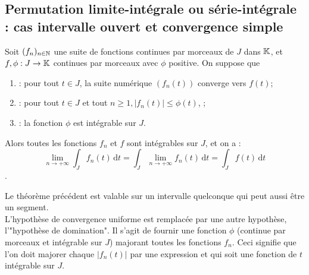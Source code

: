 \documentclass{book}
\begin{document}
\subsection{Permutation limite-intégrale ou série-intégrale : cas  intervalle ouvert et convergence simple}
\begin{Theoreme} Soit $(f_n)_{n\in\mathbb{N}}$ une suite de fonctions continues par morceaux de $J$ dans $\mathbb{K}$, et $f,\phi:J\to\mathbb{K}$ continues par morceaux avec $\phi $ positive. On suppose que
\begin{enumerate}
\item {} : pour tout $t\in J$, la suite numérique $(f_n(t))$ converge vers $f(t)$;
\item {} : pour tout $t\in J$ et tout $n\geq 1, |f_n(t)|\leq\phi (t)$,  ;
\item {} :  la fonction $\phi $ est intégrable sur $J$.
\end{enumerate}
Alors toutes les fonctions $f_n$ et $f$ sont intégrables sur $J$, et on a :
$$\lim_{n\to +\infty}\int_J f_n(t)\,\mathrm dt= \int_J \lim_{n\to +\infty} f_n(t)\,\mathrm dt=\int_J f(t)\,\mathrm dt$$.
\end{Theoreme}
\begin{Remarque}
Le théorème précédent est valable sur un intervalle quelconque qui peut aussi être un segment.\\
L'hypothèse de convergence uniforme est remplacée par une autre hypothèse, l'"hypothèse de domination". Il s'agit de
fournir une fonction $\phi$ (continue par morceaux et intégrable sur $J$) majorant toutes les fonctions $f_n$. Ceci signifie que l'on
doit majorer chaque $|f_n(t)|$ par une expression  et qui soit une fonction de $t$
intégrable sur $J$. 
\end{Remarque}
\end{document}
